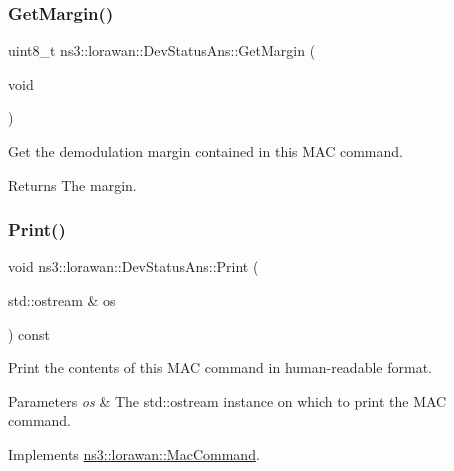 \subsubsection{\texorpdfstring{Get\+Margin()}{GetMargin()}}
{\footnotesize\ttfamily uint8\+\_\+t ns3\+::lorawan\+::\+Dev\+Status\+Ans\+::\+Get\+Margin (\begin{DoxyParamCaption}\item[{void}]{ }\end{DoxyParamCaption})}

Get the demodulation margin contained in this M\+AC command.

\begin{DoxyReturn}{Returns}
The margin. 
\end{DoxyReturn}
\mbox{\label{classns3_1_1lorawan_1_1DevStatusAns_a167cca1cb129a2084dcc5412a00b3126}} 
\subsubsection{\texorpdfstring{Print()}{Print()}}
{\footnotesize\ttfamily void ns3\+::lorawan\+::\+Dev\+Status\+Ans\+::\+Print (\begin{DoxyParamCaption}\item[{std\+::ostream \&}]{os }\end{DoxyParamCaption}) const\hspace{0.3cm}{\ttfamily [virtual]}}

Print the contents of this M\+AC command in human-\/readable format.


\begin{DoxyParams}{Parameters}
{\em os} & The std\+::ostream instance on which to print the M\+AC command. \\
\hline
\end{DoxyParams}


Implements \hyperlink{classns3_1_1lorawan_1_1MacCommand_a6bf88db38dab7dcd817811a9fb59f920}{ns3\+::lorawan\+::\+Mac\+Command}.

\mbox{\label{classns3_1_1lorawan_1_1DevStatusAns_ab1e376c78c06b679eeb6d73d32aaa62f}} 
